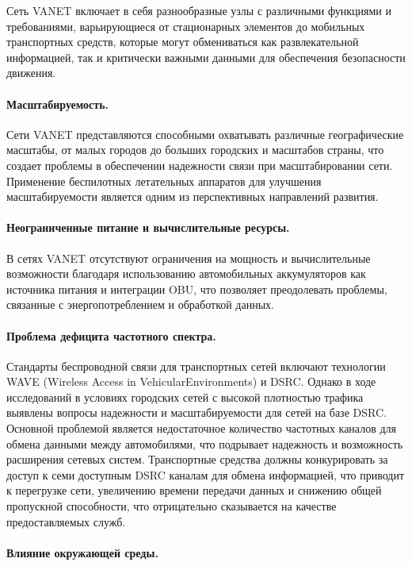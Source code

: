 Сеть VANET включает в себя разнообразные узлы с различными функциями и требованиями, варьирующиеся от стационарных элементов до мобильных транспортных средств, которые могут обмениваться как развлекательной информацией, так и критически важными данными для обеспечения безопасности движения.

\paragraph{Масштабируемость.}

Сети VANET представляются способными охватывать различные географические масштабы, от малых городов до больших городских и масштабов страны, что создает проблемы в обеспечении надежности связи при масштабировании сети. Применение беспилотных летательных аппаратов для улучшения масштабируемости является одним из перспективных направлений развития.

\paragraph{Неограниченные питание и вычислительные ресурсы.}

В сетях VANET отсутствуют ограничения на мощность и вычислительные возможности благодаря использованию автомобильных аккумуляторов как источника питания и интеграции OBU, что позволяет преодолевать проблемы, связанные с энергопотреблением и обработкой данных.

\paragraph{Проблема дефицита частотного спектра.}

Стандарты беспроводной связи для транспортных сетей включают технологии WAVE (Wireless Access in Vehicular\linebreak Environments) и DSRC. Однако в ходе исследований в условиях городских сетей с высокой плотностью трафика выявлены вопросы надежности и масштабируемости для сетей на базе DSRC. Основной проблемой является недостаточное количество частотных каналов для обмена данными между автомобилями, что подрывает надежность и возможность расширения сетевых систем. Транспортные средства должны конкурировать за доступ к семи доступным DSRC каналам для обмена информацией, что приводит к перегрузке сети, увеличению времени передачи данных и снижению общей пропускной способности, что отрицательно сказывается на качестве предоставляемых служб.

\paragraph{Влияние окружающей среды.}

